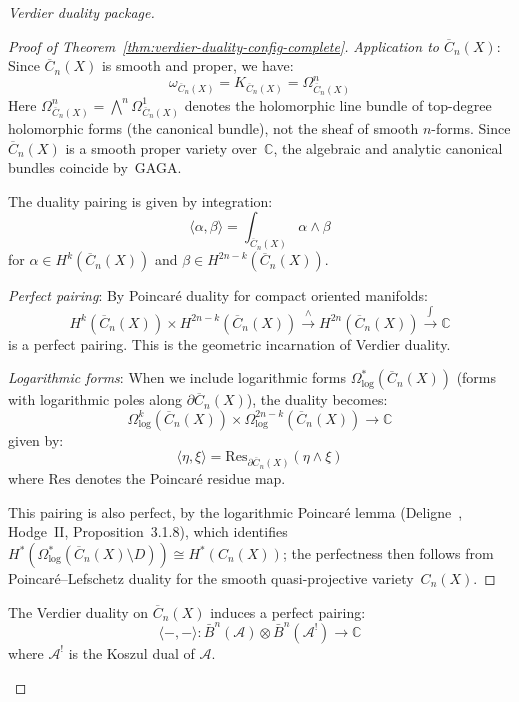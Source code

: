 \begin{proof}[Verdier duality package]
\begin{proof}[Proof of Theorem~\ref{thm:verdier-duality-config-complete}]
\emph{Application to $\overline{C}_n(X)$}: Since $\overline{C}_n(X)$ is smooth and
proper, we have:
\begin{equation}
\omega_{\overline{C}_n(X)} = K_{\overline{C}_n(X)} = \Omega^{n}_{\overline{C}_n(X)}
\end{equation}
Here $\Omega^n_{\overline{C}_n(X)} = \bigwedge^n \Omega^1_{\overline{C}_n(X)}$ denotes the holomorphic line bundle of top-degree holomorphic forms (the canonical bundle), not the sheaf of smooth $n$-forms.
Since $\overline{C}_n(X)$ is a smooth proper variety over~$\mathbb{C}$, the algebraic and analytic canonical bundles coincide by~GAGA.

The duality pairing is given by integration:
\begin{equation}
\langle \alpha, \beta \rangle = \int_{\overline{C}_n(X)} \alpha \wedge \beta
\end{equation}
for $\alpha \in H^k(\overline{C}_n(X))$ and $\beta \in H^{2n-k}(\overline{C}_n(X))$.

\emph{Perfect pairing}: By Poincaré duality for compact oriented manifolds:
\begin{equation}
H^k(\overline{C}_n(X)) \times H^{2n-k}(\overline{C}_n(X)) \xrightarrow{\wedge}
H^{2n}(\overline{C}_n(X)) \xrightarrow{\int} \mathbb{C}
\end{equation}
is a perfect pairing. This is the geometric incarnation of Verdier duality.

\emph{Logarithmic forms}: When we include logarithmic forms $\Omega^*_{\log}(
\overline{C}_n(X))$ (forms with logarithmic poles along $\partial \overline{C}_n(X)$),
the duality becomes:
\begin{equation}
\Omega^k_{\log}(\overline{C}_n(X)) \times \Omega^{2n-k}_{\log}(\overline{C}_n(X))
\to \mathbb{C}
\end{equation}
given by:
\begin{equation}
\langle \eta, \xi \rangle = \text{Res}_{\partial \overline{C}_n(X)} (\eta \wedge \xi)
\end{equation}
where $\text{Res}$ denotes the Poincaré residue map.

This pairing is also perfect, by the logarithmic Poincar\'e lemma
(Deligne~\cite{Deligne71}, Hodge~II, Proposition~3.1.8), which
identifies $H^*(\Omega^*_{\log}(\overline{C}_n(X) \setminus D))
\cong H^*(C_n(X))$; the perfectness then follows from
Poincar\'e--Lefschetz duality for the smooth quasi-projective
variety~$C_n(X)$.
\end{proof}

\begin{corollary}
\label{cor:duality-bar-complexes-complete}
The Verdier duality on $\overline{C}_n(X)$ induces a perfect pairing:
\begin{equation}
\langle -, - \rangle: \bar{B}^n(\mathcal{A}) \otimes \bar{B}^n(\mathcal{A}^!) \to
\mathbb{C}
\end{equation}
where $\mathcal{A}^!$ is the Koszul dual of $\mathcal{A}$.
\end{corollary}


\end{proof}
